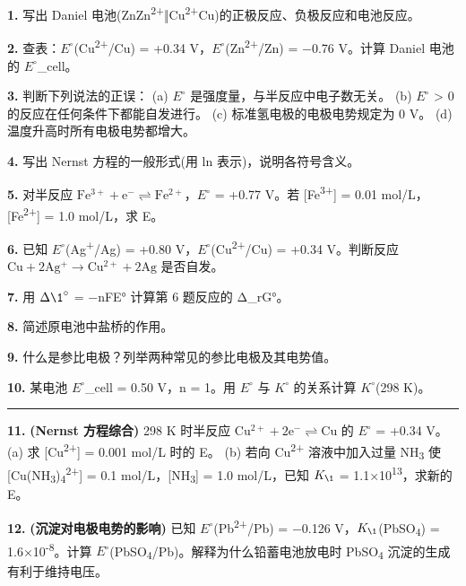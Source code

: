 \documentclass[a4paper,11pt]{ctexart}
\begin{document}
\textbf{1.} 写出 Daniel 电池(Zn\textbar Zn\textsuperscript{2+}‖Cu\textsuperscript{2+}\textbar Cu)的正极反应、负极反应和电池反应。

\textbf{2.} 查表：\(E^{\circ}\)(Cu\textsuperscript{2+}/Cu) = +0.34 V，\(E^{\circ}\)(Zn\textsuperscript{2+}/Zn) = −0.76 V。计算 Daniel 电池的 \(E^{\circ}\)\_cell。

\textbf{3.} 判断下列说法的正误：
(a) \(E^{\circ}\) 是强度量，与半反应中电子数无关。
(b) \(E^{\circ}\) \textgreater{} 0 的反应在任何条件下都能自发进行。
(c) 标准氢电极的电极电势规定为 0 V。
(d) 温度升高时所有电极电势都增大。

\textbf{4.} 写出 Nernst 方程的一般形式(用 ln 表示)，说明各符号含义。

\textbf{5.} 对半反应 \(\mathrm{Fe^{3+} + e^- \rightleftharpoons Fe^{2+}}\)，\(E^{\circ}\) = +0.77 V。若 {[}Fe\textsuperscript{3+}{]} = 0.01 mol/L，{[}Fe\textsuperscript{2+}{]} = 1.0 mol/L，求 E。

\textbf{6.} 已知 \(E^{\circ}\)(Ag\textsuperscript{+}/Ag) = +0.80 V，\(E^{\circ}\)(Cu\textsuperscript{2+}/Cu) = +0.34 V。判断反应 \(\mathrm{Cu + 2Ag^+ \to Cu^{2+} + 2Ag}\) 是否自发。

\textbf{7.} 用 \(\Delta \1^{\circ}\) = −nFE° 计算第 6 题反应的 Δ\_rG°。

\textbf{8.} 简述原电池中盐桥的作用。

\textbf{9.} 什么是参比电极？列举两种常见的参比电极及其电势值。

\textbf{10.} 某电池 \(E^{\circ}\)\_cell = 0.50 V，n = 1。用 \(E^{\circ}\) 与 \(K^{\circ}\) 的关系计算 \(K^{\circ}\)(298 K)。

\begin{center}\rule{0.5\linewidth}{0.5pt}\end{center}

\textbf{11.} \textbf{(Nernst 方程综合)} 298 K 时半反应 \(\mathrm{Cu^{2+} + 2e^- \rightleftharpoons Cu}\) 的 \(E^{\circ}\) = +0.34 V。
(a) 求 {[}Cu\textsuperscript{2+}{]} = 0.001 mol/L 时的 E。
(b) 若向 Cu\textsuperscript{2+} 溶液中加入过量 NH\textsubscript{3} 使 {[}Cu(NH\textsubscript{3})\textsubscript{4}\textsuperscript{2+}{]} = 0.1 mol/L，{[}NH\textsubscript{3}{]} = 1.0 mol/L，已知 \(K_{\1}\) = 1.1×10\textsuperscript{13}，求新的 E。

\textbf{12.} \textbf{(沉淀对电极电势的影响)} 已知 \(E^{\circ}\)(Pb\textsuperscript{2+}/Pb) = −0.126 V，\(K_{\1}\)(PbSO\textsubscript{4}) = 1.6×10\textsuperscript{-8}。计算 \(E^{\circ}\)(PbSO\textsubscript{4}/Pb)。解释为什么铅蓄电池放电时 PbSO\textsubscript{4} 沉淀的生成有利于维持电压。
\end{document}
